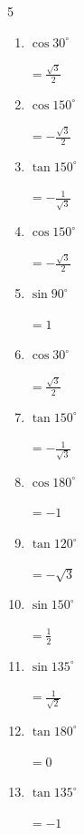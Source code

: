 \begin{multicols}{5}
\begin{enumerate}
  \item $\displaystyle \cos{30^\circ}$

        $\displaystyle =\frac{\sqrt{3}}{2}$

  \item $\displaystyle \cos{150^\circ}$

        $\displaystyle =-\frac{\sqrt{3}}{2}$

  \item $\displaystyle \tan{150^\circ}$

        $\displaystyle =-\frac{1}{\sqrt{3}}$

  \item $\displaystyle \cos{150^\circ}$

        $\displaystyle =-\frac{\sqrt{3}}{2}$

  \item $\displaystyle \sin{90^\circ}$

        $\displaystyle =1$

  \item $\displaystyle \cos{30^\circ}$

        $\displaystyle =\frac{\sqrt{3}}{2}$

  \item $\displaystyle \tan{150^\circ}$

        $\displaystyle =-\frac{1}{\sqrt{3}}$

  \item $\displaystyle \cos{180^\circ}$

        $\displaystyle =-1$

  \item $\displaystyle \tan{120^\circ}$

        $\displaystyle =-\sqrt{3}$

  \item $\displaystyle \sin{150^\circ}$

        $\displaystyle =\frac{1}{2}$

  \item $\displaystyle \sin{135^\circ}$

        $\displaystyle =\frac{1}{\sqrt{2}}$

  \item $\displaystyle \tan{180^\circ}$

        $\displaystyle =0$

  \item $\displaystyle \tan{135^\circ}$

        $\displaystyle =-1$

\columnbreak %


\end{enumerate}
\end{multicols}
